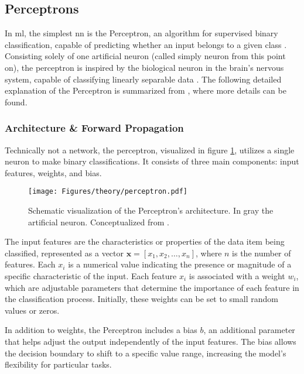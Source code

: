 \subsection{Perceptrons}

In \gls{ml}, the simplest \gls{nn} is the Perceptron, an algorithm for supervised binary classification, capable of predicting whether an input belongs to a given class \autocite{Rosenblatt1957}. Consisting solely of one artificial neuron (called simply neuron from this point on), the perceptron is inspired by the biological neuron in the brain's nervous system, capable of classifying linearly separable data \autocite{Rosenblatt1957,Szeliski2022}. The following detailed explanation of the Perceptron is summarized from \textcite{Bernard2021,Bishop2006,Goodfellow.Bengio.ea2016,LeCun.Bengio.ea2015,Nielsen2015,Szeliski2022,Zhang.Lipton.ea2023}, where more details can be found.

\subsubsection*{Architecture \& Forward Propagation}
\label{subsec:perceptron}

Technically not a network, the perceptron, visualized in figure \ref{fig:perceptron}, utilizes a single neuron to make binary classifications. It consists of three main components: input features, weights, and bias. 

\begin{figure}[htbp]
    \centering
    \texttt{[image: Figures/theory/perceptron.pdf]}
    \caption[Perceptron Architecture]{Schematic visualization of the Perceptron's architecture. In gray the artificial neuron. Conceptualized from \textcite{Nielsen2015,Sarker2021}.}
    \label{fig:perceptron}
\end{figure}

The input features are the characteristics or properties of the data item being classified, represented as a vector \( \mathbf{x} = [x_1, x_2, \ldots, x_n] \), where \( n \) is the number of features. Each \( x_i \) is a numerical value indicating the presence or magnitude of a specific characteristic of the input. Each feature \( x_i \) is associated with a weight \( w_i \), which are adjustable parameters that determine the importance of each feature in the classification process. Initially, these weights can be set to small random values or zeros.

In addition to weights, the Perceptron includes a bias \( b \), an additional parameter that helps adjust the output independently of the input features. The bias allows the decision boundary to shift to a specific value range, increasing the model's flexibility for particular tasks.


